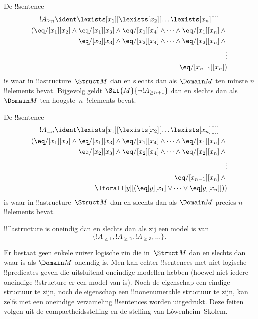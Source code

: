 \documentclass[openany]{memoir}
\begin{document}
\begin{prop}
De !!{sentence}
\begin{multline*}
  !A_{\ge n} \ident \lexists[x_1][\lexists[x_2][\dots\lexists[x_n][{}]]]\\
  \begin{aligned}
  (\eq/[x_1][x_2] \land {}
  \eq/[x_1][x_3] \land \eq/[x_1][x_4] \land \dots \land \eq/[x_1][x_n] \land {}\\
\eq/[x_2][x_3] \land \eq/[x_2][x_4] \land \dots \land {} \eq/[x_2][x_n] \land {} \\
\vdots\\
\eq/[x_{n-1}][x_n])
\end{aligned}
\end{multline*}
is waar in !!a{structure}~$\Struct M$ dan en slechts dan als
$\Domain M$ ten minste $n$ !!{element}s bevat. Bijgevolg geldt
$\Sat{M}{\lnot !A_{\ge n+1}}$ dan en slechts dan als $\Domain M$ ten
hoogste~$n$ !!{element}s bevat.

\end{prop}

\begin{prop}
De !!{sentence}
\begin{multline*}
!A_{= n} \ident \lexists[x_1][\lexists[x_2][\dots\lexists[x_n][{}]]] \\
\begin{aligned}
  (\eq/[x_1][x_2] \land {}
  \eq/[x_1][x_3] \land \eq/[x_1][x_4] \land \dots \land \eq/[x_1][x_n] \land {}\\
\eq/[x_2][x_3] \land \eq/[x_2][x_4] \land \dots \land {} \eq/[x_2][x_n] \land {} \\
\vdots\\
\eq/[x_{n-1}][x_n] \land {} \\
\lforall[y][(\eq[y][x_1] \lor \dots \lor \eq[y][x_n]]))
\end{aligned}
\end{multline*}
is waar in !!a{structure}~$\Struct M$ dan en slechts dan als
$\Domain M$ precies $n$ !!{element}s bevat.
\end{prop}

\begin{prop}
!!^a{structure} is oneindig dan en slechts dan als zij een model is van
\[
\{!A_{\ge 1}, !A_{\ge 2}, !A_{\ge 3}, \dots \}.
\]
\end{prop}

Er bestaat geen enkele zuiver logische zin die in~$\Struct M$ dan en
slechts dan waar is als $\Domain M$ oneindig is. Men kan echter
!!{sentence}s met niet-logische !!{predicate}s geven die uitsluitend
oneindige modellen hebben (hoewel niet iedere oneindige !!{structure}
er een model van is). Noch de eigenschap een eindige structuur te zijn,
noch de eigenschap een !!{nonenumerable} structuur te zijn, kan zelfs
met een oneindige verzameling !!{sentence}s worden uitgedrukt. Deze
feiten volgen uit de compactheidsstelling en de stelling van
L\"owenheim--Skolem.
\endgroup
\OLEndChapterHook
\end{document}
